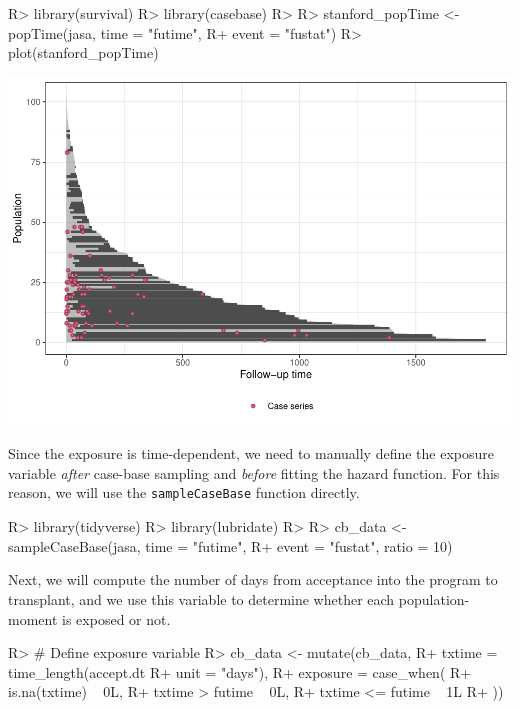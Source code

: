 \documentclass[
]{jss}
\begin{document}
\begin{CodeChunk}

\begin{CodeInput}
R> library(survival)
R> library(casebase)
R> 
R> stanford_popTime <- popTime(jasa, time = "futime", 
R+                             event = "fustat")
R> plot(stanford_popTime)
\end{CodeInput}


\begin{center}\includegraphics{../figures/stanford-poptime-1} \end{center}

\end{CodeChunk}

Since the exposure is time-dependent, we need to manually define the
exposure variable \emph{after} case-base sampling and \emph{before}
fitting the hazard function. For this reason, we will use the
\texttt{sampleCaseBase} function directly.

\begin{CodeChunk}

\begin{CodeInput}
R> library(tidyverse)
R> library(lubridate)
R> 
R> cb_data <- sampleCaseBase(jasa, time = "futime", 
R+                           event = "fustat", ratio = 10)
\end{CodeInput}
\end{CodeChunk}

Next, we will compute the number of days from acceptance into the
program to transplant, and we use this variable to determine whether
each population-moment is exposed or not.

\begin{CodeChunk}

\begin{CodeInput}
R> # Define exposure variable
R> cb_data <- mutate(cb_data,
R+                   txtime = time_length(accept.dt %
R+                                        unit = "days"),
R+                   exposure = case_when(
R+                     is.na(txtime) ~ 0L,
R+                     txtime > futime ~ 0L,
R+                     txtime <= futime ~ 1L
R+                   ))
\end{CodeInput}
\end{CodeChunk}
\end{document}
